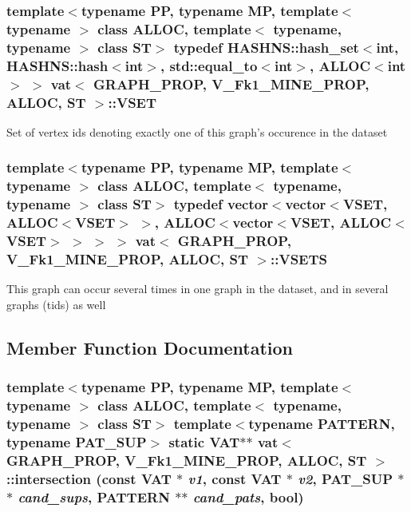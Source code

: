 \subsubsection{\setlength{\rightskip}{0pt plus 5cm}template$<$typename PP, typename MP, template$<$ typename $>$ class ALLOC, template$<$ typename, typename $>$ class ST$>$ typedef HASHNS::hash\_\-set$<$int, HASHNS::hash$<$int$>$, std::equal\_\-to$<$int$>$, ALLOC$<$int$>$ $>$ \bf{vat}$<$ GRAPH\_\-PROP, V\_\-Fk1\_\-MINE\_\-PROP, ALLOC, ST $>$::\bf{VSET}}\label{classvat_3_01GRAPH__PROP_00_01V__Fk1__MINE__PROP_00_01ALLOC_00_01ST_01_4_ff0176a2b4ec69537f5dcb9e50c82318}


Set of vertex ids denoting exactly one of this graph's occurence in the dataset 
\subsubsection{\setlength{\rightskip}{0pt plus 5cm}template$<$typename PP, typename MP, template$<$ typename $>$ class ALLOC, template$<$ typename, typename $>$ class ST$>$ typedef vector$<$vector$<$\bf{VSET}, ALLOC$<$\bf{VSET}$>$ $>$, ALLOC$<$vector$<$\bf{VSET}, ALLOC$<$\bf{VSET}$>$ $>$ $>$ $>$ \bf{vat}$<$ GRAPH\_\-PROP, V\_\-Fk1\_\-MINE\_\-PROP, ALLOC, ST $>$::\bf{VSETS}}\label{classvat_3_01GRAPH__PROP_00_01V__Fk1__MINE__PROP_00_01ALLOC_00_01ST_01_4_526a66d42ea4aab941d30c8bf37e6c16}


This graph can occur several times in one graph in the dataset, and in several graphs (tids) as well 

\subsection{Member Function Documentation}
\subsubsection{\setlength{\rightskip}{0pt plus 5cm}template$<$typename PP, typename MP, template$<$ typename $>$ class ALLOC, template$<$ typename, typename $>$ class ST$>$ template$<$typename PATTERN, typename PAT\_\-SUP$>$ static \bf{VAT}$\ast$$\ast$ \bf{vat}$<$ GRAPH\_\-PROP, V\_\-Fk1\_\-MINE\_\-PROP, ALLOC, ST $>$::intersection (const \bf{VAT} $\ast$ {\em v1}, const \bf{VAT} $\ast$ {\em v2}, PAT\_\-SUP $\ast$$\ast$ {\em cand\_\-sups}, PATTERN $\ast$$\ast$ {\em cand\_\-pats}, bool)\hspace{0.3cm}{\tt  [inline, static]}}\label{classvat_3_01GRAPH__PROP_00_01V__Fk1__MINE__PROP_00_01ALLOC_00_01ST_01_4_867248a3e91c6b8d64b30fd3e5988ef7}


